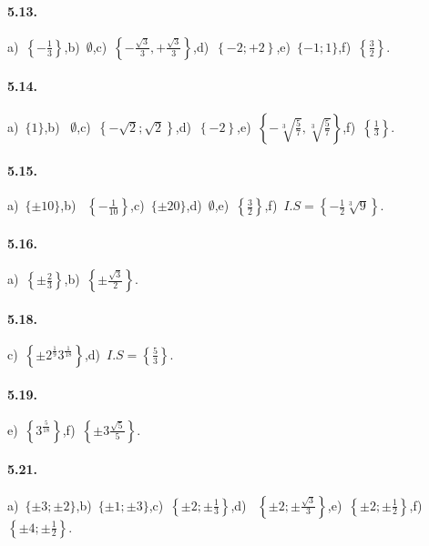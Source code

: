 \paragraph{5.13.} a)~$\left\{-\frac 1 3\right\}$,\quad b)~$\emptyset $,\quad c)~$\left\{-\frac{\sqrt 3} 3,+\frac{\sqrt 3} 3\right\}$,\quad d)~$\left\{-2;+2\right\}$,\quad e)~$\{-1;1\}$,\quad f)~$\left\{\frac 3 2\right\}$.

\paragraph{5.14.} a)~$\{1\}$,\quad b)~ $\emptyset $,\quad c)~$\left\{-\sqrt 2;\sqrt 2\right\}$,\quad d)~$\left\{-2\right\}$,\quad e)~$\left\{-\sqrt[3]{\frac 5 7},\sqrt[3]{\frac 5 7}\right\}$,\quad f)~$\left\{\frac 1 3\right\}$.

\paragraph{5.15.} a)~$\{\pm 10\}$,\quad b)~ $\left\{-\frac 1{10}\right\}$,\quad c)~$\{\pm 20\}$,\quad d)~$\emptyset $,\quad e)~$\left\{\frac 3 2\right\}$,\quad f)~${I.S}=\left\{-\frac 1 2\sqrt[3]9\right\}$.

\paragraph{5.16.} a)~$\left\{\pm \frac 2 3\right\}$,\quad b)~$\left\{\pm \frac{\sqrt 3} 2\right\}$.

\paragraph{5.18.} c)~$\left\{\pm 2^{\frac 1 9}3^{\frac 1{18}}\right\}$,\quad d)~${I.S}=\left\{\frac 5 3\right\}$.

\paragraph{5.19.} e)~$\left\{3^{\frac 5{18}}\right\}$,\quad f)~$\left\{\pm 3\frac{\sqrt 5} 5\right\}$.

\paragraph{5.21.} a)~$\{\pm 3;\pm 2\}$,\quad b)~$\{\pm 1; \pm 3\}$,\quad c)~$\left\{\pm 2;\pm \frac 1 3\right\}$,\quad d)~ $\left\{\pm 2;\pm \frac{\sqrt 3} 3\right\}$,\quad e)~$\left\{\pm 2;\pm \frac 1 2\right\}$,\quad f)~$\left\{\pm 4;\pm \frac 1 2\right\}$.

